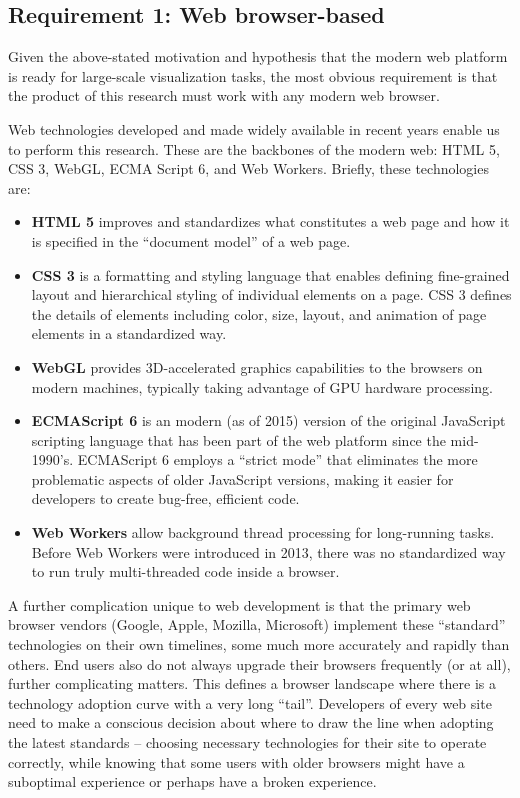 \hypertarget{requirement-1-web-browser-based}{%
\subsection{Requirement 1: Web browser-based}\label{requirement-1-web-browser-based}}

Given the above-stated motivation and hypothesis that the modern web platform is ready for large-scale visualization tasks, the most obvious requirement is that the product of this research must work with any modern web browser.

Web technologies developed and made widely available in recent years enable us to perform this research. These are the backbones of the modern web: HTML 5, CSS 3, WebGL, ECMA Script 6, and Web Workers. Briefly, these technologies are:

\begin{itemize}
\tightlist
\item
  \textbf{HTML 5} improves and standardizes what constitutes a web page and how it is specified in the ``document model'' of a web page.
\item
  \textbf{CSS 3} is a formatting and styling language that enables defining fine-grained layout and hierarchical styling of individual elements on a page. CSS 3 defines the details of elements including color, size, layout, and animation of page elements in a standardized way.
\item
  \textbf{WebGL} provides 3D-accelerated graphics capabilities to the browsers on modern machines, typically taking advantage of \gls{GPU} hardware processing.
\item
  \textbf{ECMAScript 6} is an modern (as of 2015) version of the original
  JavaScript scripting language that has been part of the web platform
  since the mid-1990's. ECMAScript 6 employs a ``strict mode'' that eliminates the
  more problematic aspects of older JavaScript versions, making it easier for
  developers to create bug-free, efficient code.
\item
  \textbf{Web Workers} allow background thread processing for long-running tasks. Before
  Web Workers were introduced in 2013, there was no standardized way to run truly multi-threaded code inside a browser.
\end{itemize}

A further complication unique to web development is that the primary web browser vendors (Google, Apple, Mozilla, Microsoft) implement these ``standard'' technologies on their own timelines, some much more accurately and rapidly than others. End users also do not always upgrade their browsers frequently (or at all), further complicating matters. This defines a browser landscape where there is a technology adoption curve with a very long ``tail''. Developers of every web site need to make a conscious decision about where to draw the line when adopting the latest standards -- choosing necessary technologies for their site to operate correctly, while knowing that some users with older browsers might have a suboptimal experience or perhaps have a broken experience.

